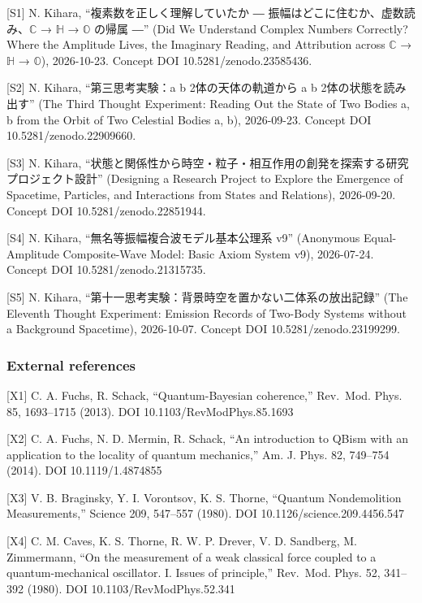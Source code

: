 \documentclass[
  a4paper,
]{article}
\begin{document}
{[}S1{]} N. Kihara, ``複素数を正しく理解していたか ―
振幅はどこに住むか、虚数読み、\(\mathbb{C}\) → \(\mathbb{H}\) →
\(\mathbb{O}\) の帰属 ―'' (Did We Understand Complex Numbers Correctly?
Where the Amplitude Lives, the Imaginary Reading, and Attribution across
\(\mathbb{C}\) → \(\mathbb{H}\) → \(\mathbb{O}\)), 2026-10-23. Concept
DOI 10.5281/zenodo.23585436.

{[}S2{]} N. Kihara, ``第三思考実験：a b 2体の天体の軌道から a b
2体の状態を読み出す'' (The Third Thought Experiment: Reading Out the
State of Two Bodies a, b from the Orbit of Two Celestial Bodies a, b),
2026-09-23. Concept DOI 10.5281/zenodo.22909660.

{[}S3{]} N. Kihara,
``状態と関係性から時空・粒子・相互作用の創発を探索する研究プロジェクト設計''
(Designing a Research Project to Explore the Emergence of Spacetime,
Particles, and Interactions from States and Relations), 2026-09-20.
Concept DOI 10.5281/zenodo.22851944.

{[}S4{]} N. Kihara, ``無名等振幅複合波モデル基本公理系 v9'' (Anonymous
Equal-Amplitude Composite-Wave Model: Basic Axiom System v9),
2026-07-24. Concept DOI 10.5281/zenodo.21315735.

{[}S5{]} N. Kihara,
``第十一思考実験：背景時空を置かない二体系の放出記録'' (The Eleventh
Thought Experiment: Emission Records of Two-Body Systems without a
Background Spacetime), 2026-10-07. Concept DOI 10.5281/zenodo.23199299.

\subsubsection{External references}\label{external-references}

{[}X1{]} C. A. Fuchs, R. Schack, ``Quantum-Bayesian coherence,''
Rev.~Mod. Phys. 85, 1693--1715 (2013). DOI 10.1103/RevModPhys.85.1693

{[}X2{]} C. A. Fuchs, N. D. Mermin, R. Schack, ``An introduction to
QBism with an application to the locality of quantum mechanics,'' Am. J.
Phys. 82, 749--754 (2014). DOI 10.1119/1.4874855

{[}X3{]} V. B. Braginsky, Y. I. Vorontsov, K. S. Thorne, ``Quantum
Nondemolition Measurements,'' Science 209, 547--557 (1980). DOI
10.1126/science.209.4456.547

{[}X4{]} C. M. Caves, K. S. Thorne, R. W. P. Drever, V. D. Sandberg, M.
Zimmermann, ``On the measurement of a weak classical force coupled to a
quantum-mechanical oscillator. I. Issues of principle,'' Rev.~Mod. Phys.
52, 341--392 (1980). DOI 10.1103/RevModPhys.52.341
\end{document}
